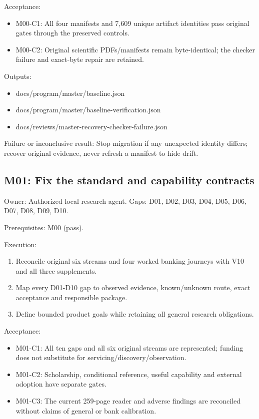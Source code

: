 \documentclass[
  11pt,
  a4paper,
]{article}
\providecommand{\tightlist}{%
  \setlength{\itemsep}{0pt}\setlength{\parskip}{0pt}}
\begin{document}
Acceptance:

\begin{itemize}
\tightlist
\item
  M00-C1: All four manifests and 7,609 unique artifact identities pass
  original gates through the preserved controls.
\item
  M00-C2: Original scientific PDFs/manifests remain byte-identical; the
  checker failure and exact-byte repair are retained.
\end{itemize}

Outputs:

\begin{itemize}
\tightlist
\item
  docs/program/master/baseline.json
\item
  docs/program/master/baseline-verification.json
\item
  docs/reviews/master-recovery-checker-failure.json
\end{itemize}

Failure or inconclusive result: Stop migration if any unexpected
identity differs; recover original evidence, never refresh a manifest to
hide drift.

\hypertarget{m01-fix-the-standard-and-capability-contracts}{%
\subsection{M01: Fix the standard and capability
contracts}\label{m01-fix-the-standard-and-capability-contracts}}

Owner: Authorized local research agent. Gaps: D01, D02, D03, D04, D05,
D06, D07, D08, D09, D10.

Prerequisites: M00 (pass).

Execution:

\begin{enumerate}
\def\labelenumi{\arabic{enumi}.}
\tightlist
\item
  Reconcile original six streams and four worked banking journeys with
  V10 and all three supplements.
\item
  Map every D01-D10 gap to observed evidence, known/unknown route, exact
  acceptance and responsible package.
\item
  Define bounded product goals while retaining all general research
  obligations.
\end{enumerate}

Acceptance:

\begin{itemize}
\tightlist
\item
  M01-C1: All ten gaps and all six original streams are represented;
  funding does not substitute for servicing/discovery/observation.
\item
  M01-C2: Scholarship, conditional reference, useful capability and
  external adoption have separate gates.
\item
  M01-C3: The current 259-page reader and adverse findings are
  reconciled without claims of general or bank calibration.
\end{itemize}
\end{document}
